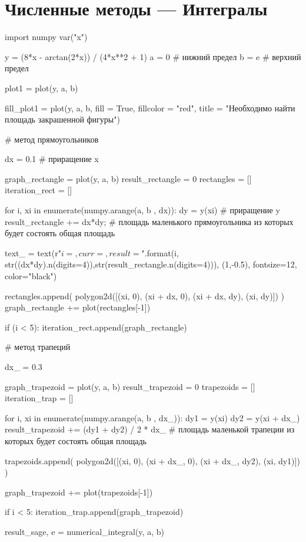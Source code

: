 \section{Численные методы — Интегралы}

\begin{sagesilent}
	import numpy
	var("x")
	
	y = (8*x - arctan(2*x)) / (4*x**2 + 1)
	a = 0 # нижний предел
	b = e # верхний предел
	
	plot1 = plot(y, a, b)
	
	fill_plot1 = plot(y, a, b, fill = True, fillcolor = "red", title = "Необходимо найти площадь закрашенной фигуры")
	
	# метод прямоугольников
	
	dx = 0.1 # приращение x
	
	graph_rectangle = plot(y, a, b)
	result_rectangle = 0
	rectangles = []
	iteration_rect = []
	
	for i, xi in enumerate(numpy.arange(a, b , dx)):
	    dy = y(xi) # приращение y
	    result_rectangle += dx*dy; # площадь маленького прямоугольника из которых будет состоять общая площадь
	
	    text_ = text(r"$i={}, curr={}, result={}$".format(i, str((dx*dy).n(digits=4)),str(result_rectangle.n(digits=4))), (1,-0.5), fontsize=12, color="black")
	
	    rectangles.append(
	        polygon2d([(xi, 0),
	        (xi + dx, 0),
	        (xi + dx, dy),
	        (xi, dy)])
	        )
	    graph_rectangle += plot(rectangles[-1])

	    if (i < 5):
	        iteration_rect.append(graph_rectangle)
	    
	
# метод трапеций

dx_ = 0.3

graph_trapezoid = plot(y, a, b)
result_trapezoid = 0
trapezoids = []
iteration_trap = []


for i, xi in enumerate(numpy.arange(a, b , dx_)):
    dy1 = y(xi)
    dy2 = y(xi + dx_)
    result_trapezoid += (dy1 + dy2) / 2 * dx_ # площадь маленькой трапеции из которых будет состоять общая площадь

    trapezoids.append(
        polygon2d([(xi, 0),
        (xi + dx_, 0),
        (xi + dx_, dy2),
        (xi, dy1)])
    )

    graph_trapezoid += plot(trapezoids[-1])

    if i < 5:
        iteration_trap.append(graph_trapezoid)

result_sage, e = numerical_integral(y, a, b)

\end{sagesilent}

